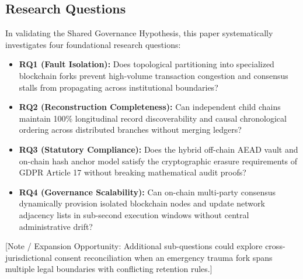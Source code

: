 \subsection{Research Questions}
In validating the Shared Governance Hypothesis, this paper systematically investigates four foundational research questions:
\begin{itemize}
    \item \textbf{RQ1 (Fault Isolation):} Does topological partitioning into specialized blockchain forks prevent high-volume transaction congestion and consensus stalls from propagating across institutional boundaries?
    \item \textbf{RQ2 (Reconstruction Completeness):} Can independent child chains maintain 100\% longitudinal record discoverability and causal chronological ordering across distributed branches without merging ledgers?
    \item \textbf{RQ3 (Statutory Compliance):} Does the hybrid off-chain AEAD vault and on-chain hash anchor model satisfy the cryptographic erasure requirements of GDPR Article 17 without breaking mathematical audit proofs?
    \item \textbf{RQ4 (Governance Scalability):} Can on-chain multi-party consensus dynamically provision isolated blockchain nodes and update network adjacency lists in sub-second execution windows without central administrative drift?
\end{itemize}

[Note / Expansion Opportunity: Additional sub-questions could explore cross-jurisdictional consent reconciliation when an emergency trauma fork spans multiple legal boundaries with conflicting retention rules.]

